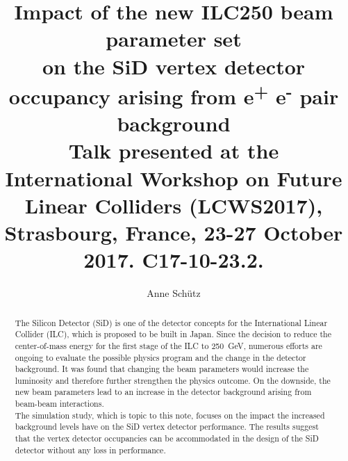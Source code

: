 \documentclass[12pt]{article}
\newcommand{\sid}{SiD\xspace}
\newcommand{\electron}{e\textsuperscript{-}\xspace}
\newcommand{\positron}{e\textsuperscript{+}\xspace}
\begin{document}

\title{Impact of the new ILC250 beam parameter set\\on the \sid vertex detector occupancy arising from \positron\electron pair background\vspace*{0.3cm}\\{\normalsize Talk presented at the\\\large International Workshop on Future Linear Colliders (LCWS2017), Strasbourg, France, 23-27 October 2017. C17-10-23.2.}}

\author[1,2]{Anne Sch\"utz}


\maketitle


\begin{abstract}
The Silicon Detector (SiD) is one of the detector concepts for the International Linear Collider (ILC), which is proposed to be built in Japan.
Since the decision to reduce the center-of-mass energy for the first stage of the ILC to \SI{250}{\GeV}, numerous efforts are ongoing to evaluate the possible physics program and the change in the detector background.
It was found that changing the beam parameters would increase the luminosity and therefore further strengthen the physics outcome.
On the downside, the new beam parameters lead to an increase in the detector background arising from beam-beam interactions.
\\
The simulation study, which is topic to this note, focuses on the impact the increased background levels have on the SiD vertex detector performance.
The results suggest that the vertex detector occupancies can be accommodated in the design of the SiD detector without any loss in performance.
\end{abstract}


\end{document}
